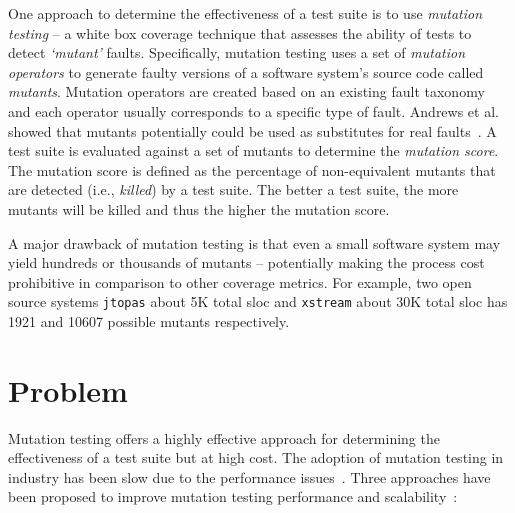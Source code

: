 One approach to determine the effectiveness of a test suite is to use \emph{mutation testing} -- a white box coverage technique that assesses the ability of tests to detect \emph{`mutant'} faults. Specifically, mutation testing uses a set of \emph{mutation operators} to generate faulty versions of a software system's source code called \emph{mutants}. Mutation operators are created based on an existing fault taxonomy and each operator usually corresponds to a specific type of fault. Andrews et al. showed that mutants potentially could be used as substitutes for real faults~\cite{ABLN06}. A test suite is evaluated against a set of mutants to determine the \emph{mutation score}. The mutation score is defined as the percentage of non-equivalent mutants that are detected (i.e., \emph{killed}) by a test suite. The better a test suite, the more mutants will be killed and thus the higher the mutation score.

A major drawback of mutation testing is that even a small software system may yield hundreds or thousands of mutants -- potentially making the process cost prohibitive in comparison to other coverage metrics. For example, two open source systems \texttt{jtopas} about 5K total \gls{sloc} and \texttt{xstream} about 30K total \gls{sloc} has 1921 and 10607 possible mutants respectively\cite{SZ09}.


\section{Problem}
\label{sec:introduction_problem}
Mutation testing offers a highly effective approach for determining the effectiveness of a test suite but at high cost. The adoption of mutation testing in industry has been slow due to the performance issues~\cite{?}. Three approaches have been proposed to improve mutation testing performance and scalability~\cite{OU00}:

